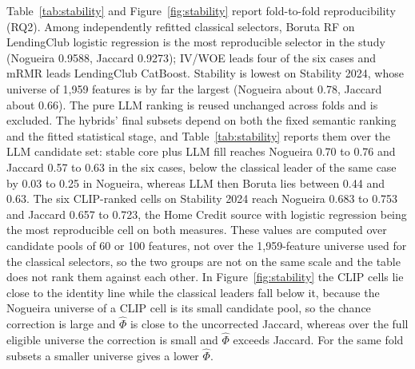 \documentclass[final,5p,twocolumn]{elsarticle}
\begin{document}
Table~\ref{tab:stability} and Figure~\ref{fig:stability} report fold-to-fold reproducibility (RQ2). Among independently refitted classical selectors, Boruta RF on LendingClub logistic regression is the most reproducible selector in the study (Nogueira 0.9588, Jaccard 0.9273); IV/WOE leads four of the six cases and mRMR leads LendingClub CatBoost. Stability is lowest on Stability 2024, whose universe of 1,959 features is by far the largest (Nogueira about 0.78, Jaccard about 0.66). The pure LLM ranking is reused unchanged across folds and is excluded. The hybrids' final subsets depend on both the fixed semantic ranking and the fitted statistical stage, and Table~\ref{tab:stability} reports them over the LLM candidate set: stable core plus LLM fill reaches Nogueira 0.70 to 0.76 and Jaccard 0.57 to 0.63 in the six cases, below the classical leader of the same case by 0.03 to 0.25 in Nogueira, whereas LLM then Boruta lies between 0.44 and 0.63. The six CLIP-ranked cells on Stability 2024 reach Nogueira 0.683 to 0.753 and Jaccard 0.657 to 0.723, the Home Credit source with logistic regression being the most reproducible cell on both measures. These values are computed over candidate pools of 60 or 100 features, not over the 1,959-feature universe used for the classical selectors, so the two groups are not on the same scale and the table does not rank them against each other. In Figure~\ref{fig:stability} the CLIP cells lie close to the identity line while the classical leaders fall below it, because the Nogueira universe of a CLIP cell is its small candidate pool, so the chance correction is large and $\hat\Phi$ is close to the uncorrected Jaccard, whereas over the full eligible universe the correction is small and $\hat\Phi$ exceeds Jaccard. For the same fold subsets a smaller universe gives a lower $\hat\Phi$.
\end{document}
